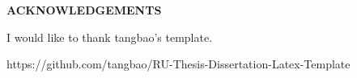 \clearpage
\begin{centering}
\textbf{ACKNOWLEDGEMENTS}\\
\vspace{\baselineskip}
\end{centering}

I would like to thank tangbao's template.

https://github.com/tangbao/RU-Thesis-Dissertation-Latex-Template

\clearpage
